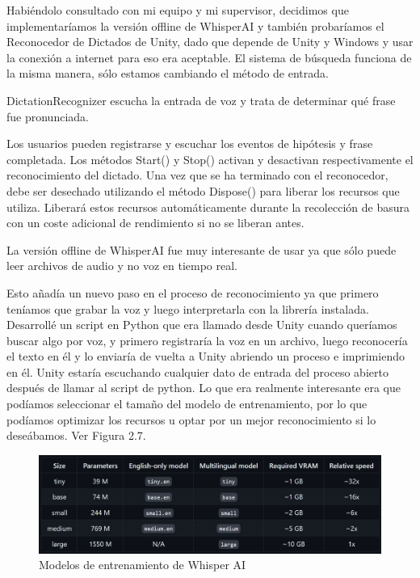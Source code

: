 Habiéndolo consultado con mi equipo y mi supervisor, decidimos que implementaríamos la versión offline de WhisperAI y también probaríamos el Reconocedor de Dictados de Unity, dado que depende de Unity y Windows y usar la conexión a internet para eso era aceptable.
El sistema de búsqueda funciona de la misma manera, sólo estamos cambiando el método de entrada.

DictationRecognizer escucha la entrada de voz y trata de determinar qué frase fue pronunciada. \cite[]{DicationRecognizer}

Los usuarios pueden registrarse y escuchar los eventos de hipótesis y frase completada. Los métodos Start() y Stop() activan y desactivan respectivamente el reconocimiento del dictado. Una vez que se ha terminado con el reconocedor, debe ser desechado utilizando el método Dispose() para liberar los recursos que utiliza. Liberará estos recursos automáticamente durante la recolección de basura con un coste adicional de rendimiento si no se liberan antes.

La versión offline de WhisperAI fue muy interesante de usar ya que sólo puede leer archivos de audio y no voz en tiempo real. \cite[]{WhisperAI}

Esto añadía un nuevo paso en el proceso de reconocimiento ya que primero teníamos que grabar la voz y luego interpretarla con la librería instalada.
Desarrollé un script en Python que era llamado desde Unity cuando queríamos buscar algo por voz, y primero registraría la voz en un archivo, luego reconocería el texto en él y lo enviaría de vuelta a Unity abriendo un proceso e imprimiendo en él.
Unity estaría escuchando cualquier dato de entrada del proceso abierto después de llamar al script de python. Lo que era realmente interesante era que podíamos seleccionar el tamaño del modelo de entrenamiento, por lo que podíamos optimizar los recursos u optar por un mejor reconocimiento si lo deseábamos. Ver Figura 2.7.

\begin{figure}[ht]
   \begin{center}
      \includegraphics[width=0.85\linewidth]{chapter2/figures/whisperai.png}
   \end{center}
   \caption[Modelos de entrenamiento de Whisper AI]
   {\footnotesize Modelos de entrenamiento de Whisper AI}
   \label{fig:mufigure11}
\end{figure}


